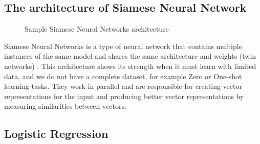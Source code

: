 \documentclass[12pt,oneside,openright,a4paper]{cpe-english-project}
\begin{document}
\subsection{The architecture of Siamese Neural Network}
\begin{figure}[!h]
  \centering
  \setlength{\fboxrule}{0.2mm}
  \setlength{\fboxsep}{0.5cm}
  \caption{Sample Siamese Neural Networks architecture}
  \label{fig:siamese_arch}
\end{figure}
Siamese Neural Networks is a type of neural network that contains multiple instances of the
same model and shares the same architecture and weights (twin networks) \cite{what_is_embedding_matrix, how_to_predict_questions_pair_using_malstm, introduction_siamese_network}
. This architecture shows its strength when it must learn with limited data, and we do not have a complete dataset,
for example Zero or One-shot learning tasks. They work in parallel and are responsible for creating vector
representations for the input and producing better vector representations by measuring similarities between vectors.

\subsection{Logistic Regression}
\end{document}
